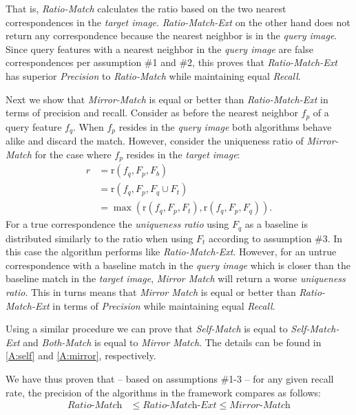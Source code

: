 \documentclass[review]{elsarticle}
\begin{document}
That is, \emph{Ratio-Match} calculates the ratio based on the two nearest correspondences in the \emph{target image}. \emph{Ratio-Match-Ext} on the other hand does not return any correspondence because the nearest neighbor is in the \emph{query image}. Since query features with a nearest neighbor in the \emph{query image} are false correspondences per assumption \#1 and \#2, this proves that \emph{Ratio-Match-Ext} has superior \emph{Precision} to \emph{Ratio-Match} while maintaining equal \emph{Recall}.

Next we show that \emph{Mirror-Match} is equal or better than \emph{Ratio-Match-Ext} in terms of precision and recall. Consider as before the nearest neighbor $f_{p}$ of a query feature $f_{q}$. When $f_{p}$ resides in the \emph{query image} both algorithms behave alike and discard the match.  However, consider the uniqueness ratio of \emph{Mirror-Match} for the case where $f_{p}$ resides in the \emph{target image}:
\begin{align*}
    r &= \text{r}(f_{q}, F_{p}, F_{b}) \\
        &= \text{r}(f_{q}, F_{p}, F_{q} \cup F_{t})\\
        &= \max( \text{r}(f_{q}, F_{p}, F_{t}), 
    \text{r}(f_{q}, F_{p}, F_{q}) ).
\end{align*}
For a true correspondence the \emph{uniqueness ratio} using $F_{q}$ as a baseline is distributed similarly to the ratio when using $F_{t}$ according to assumption \#3. In this case the algorithm performs like \emph{Ratio-Match-Ext}.  However, for an untrue correspondence with a baseline match in the \emph{query image} which is closer than the baseline match in the \emph{target image}, \emph{Mirror Match} will return a worse \emph{uniqueness ratio}. This in turns means that \emph{Mirror Match} is equal or better than \emph{Ratio-Match-Ext} in terms of  \emph{Precision} while maintaining equal \emph{Recall}.

Using a similar procedure we can prove that \emph{Self-Match} is equal to \emph{Self-Match-Ext} and \emph{Both-Match} is equal to \emph{Mirror Match}.  The details can be found in \ref{A:self} and \ref{A:mirror}, respectively.

We have thus proven that -- based on assumptions \#1-3 -- for any given recall rate, the precision of the algorithms in the framework compares as follows: 
\begin{align*}
    \textit{Ratio-Match} &\leq \textit{Ratio-Match-Ext} \leq 
    \textit{Mirror-Match}
\end{align*}
\end{document}
